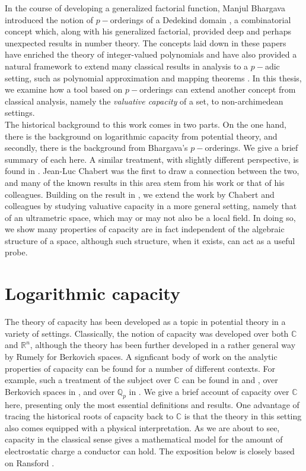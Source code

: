 
In the course of developing a generalized factorial function, Manjul Bhargava introduced the notion of $p-$orderings of a Dedekind domain \cite{mb1, mb2}, a combinatorial concept which, along with his generalized factorial, provided deep and perhaps unexpected results in number theory. The concepts laid down in these papers have enriched the theory of integer-valued polynomials \cite{mb3, kj2} and have also provided a natural framework to extend many classical results in analysis to a $p-$adic setting, such as polynomial approximation and mapping theorems \cite{mb1, mb2,mb3}. In this thesis, we examine how a tool based on $p-$orderings can extend another concept from classical analysis, namely the \textit{valuative capacity} of a set, to non-archimedean settings.\\

The historical background to this work comes in two parts. On the one hand, there is the background on logarithmic capacity from potential theory, and secondly, there is the background from Bhargava's $p-$orderings. We give a brief summary of each here. A similar treatment, with slightly different perspective, is found in \cite{fp}. Jean-Luc Chabert was the first to draw a connection between the two, and many of the known results in this area stem from his work or that of his colleagues. Building on the result in \cite{kj}, we extend the work by Chabert and colleagues by studying valuative capacity in a more general setting, namely that of an ultrametric space, which may or may not also be a local field. In doing so, we show many properties of capacity are in fact independent of the algebraic structure of a space, although such structure, when it exists, can act as a useful probe.\\

\section{Logarithmic capacity}
The theory of capacity has been developed as a topic in potential theory in a variety of settings. Classically, the notion of capacity was developed over both $\mathbb{C}$ and $\mathbb{R}^n$, although the theory has been further developed in a rather general way by Rumely for Berkovich spaces. A  signficant body of work on the analytic properties of capacity can be found for a number of different contexts. For example, such a treatment of the subject over $\mathbb{C}$ can be found in \cite{wer} and \cite{rand}, over Berkovich spaces in \cite{rum}, and over $\mathbb{Q}_p$ in \cite{dgc}. We give a brief account of capacity over $\mathbb{C}$ here, presenting only the most essential definitions and results.   One advantage of tracing the historical roots of capacity back to $\mathbb{C}$ is that the theory in this setting also comes equipped with a physical interpretation. As we are about to see, capacity in the classical sense gives a mathematical model for the amount of electrostatic charge a conductor can hold. The exposition below is closely based on Ransford \cite{rand}.\\

